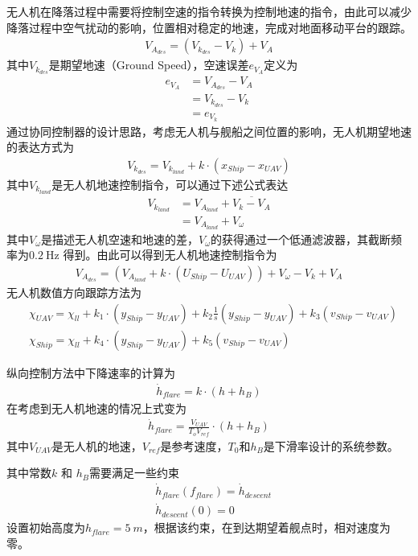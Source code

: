 无人机在降落过程中需要将控制空速的指令转换为控制地速的指令，由此可以减少降落过程中空气扰动的影响，位置相对稳定的地速，完成对地面移动平台的跟踪。
\begin{align}
V_{A_{des}} = (V_{k_{des}} -V_k) + V_A
\end{align}
其中$V_{k_{des}}$是期望地速（Ground Speed），空速误差$e_{V_A}$定义为
\begin{align}
e_{V_{A}} &= V_{A_{des}}-V_A \\
&= V_{k_{des}} - V_k \\
&= e_{V_k}
\end{align}
通过协同控制器的设计思路，考虑无人机与舰船之间位置的影响，无人机期望地速的表达方式为
\begin{align}
V_{k_{des}} = V_{k_{land}} + k \cdot (x_{Ship} - x_{UAV})
\end{align}
其中$V_{k_{land}}$是无人机地速控制指令，可以通过下述公式表达
\begin{align}
V_{k_{land}} &= V_{A_{land}} + \overline{V_k - V_A} \\
&= V_{A_{land}} + V_\omega
\end{align}
其中$V_\omega$是描述无人机空速和地速的差，$V_\omega$的获得通过一个低通滤波器，其截断频率为$0.2\ \text{Hz}$ 得到。由此可以得到无人机地速控制指令为
\begin{align}
V_{A_{des}} =( V_{A_{land}} + k \cdot (U_{Ship} - U_{UAV})) + V_\omega - V_k + V_A
\end{align}
无人机数值方向跟踪方法为
\begin{align}
&\chi_{UAV} = \chi_{ll} + k_1 \cdot (y_{Ship} - y_{UAV}) +k_2 \frac{1}{s} (y_{Ship} - y_{UAV}) + k_3 (v_{Ship} - v_{UAV}) \\
&\chi_{Ship} = \chi_{ll} + k_4 \cdot (y_{Ship} - y_{UAV}) +  k_5 (v_{Ship} - v_{UAV})
\end{align}

纵向控制方法中下降速率的计算为
\begin{align}
\dot{h}_{flare} = k \cdot (h + h_B)
\end{align}
在考虑到无人机地速的情况上式变为
\begin{align}
\dot{h}_{flare} = \frac{V_{UAV}}{T_o V_{ref}} \cdot (h + h_B)
\end{align}
其中$V_{UAV}$是无人机的地速，$V_{ref}$是参考速度，$T_0$和$h_B$是下滑率设计的系统参数。

其中常数$k$ 和 $h_B$需要满足一些约束
\begin{align}
&\dot{h}_{flare} (f_{flare}) = \dot{h}_{descent} \\
&\dot{h}_{descent}(0)  = 0
\end{align}
设置初始高度为$h_{flare} = 5\ m$，根据该约束，在到达期望着舰点时，相对速度为零。

